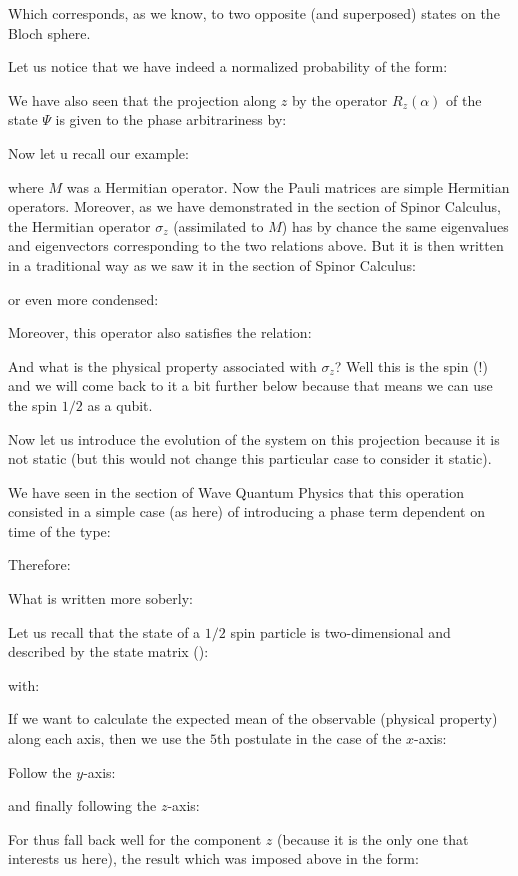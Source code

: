	Which corresponds, as we know, to two opposite (and superposed) states on the Bloch sphere.
	
	Let us notice that we have indeed a normalized probability of the form:
	
	We have also seen that the projection along $z$ by the operator $R_z(\alpha)$ of the state $\Psi$ is given to the phase arbitrariness by:
	
	Now let u recall our example:
	
	where $M$ was a Hermitian operator. Now the Pauli matrices are simple Hermitian operators. Moreover, as we have demonstrated in the section of Spinor Calculus, the Hermitian operator $\sigma_z$ (assimilated to $M$) has by chance the same eigenvalues and eigenvectors corresponding to the two relations above. But it is then written in a traditional way as we saw it in the section of Spinor Calculus:
	
	or even more condensed:
	
	Moreover, this operator also satisfies the relation:
	
	And what is the physical property associated with $\sigma_z$? Well this is the spin (!) and we will come back to it a bit further below because that means we can use the spin $1/2$ as a qubit.

	Now let us introduce the evolution of the system on this projection because it is not static (but this would not change this particular case to consider it static).

	We have seen in the section of Wave Quantum Physics that this operation consisted in a simple case (as here) of introducing a phase term dependent on time of the type:
	
	Therefore:
	
	What is written more soberly:
	
	Let us recall that the state of a $1/2$ spin particle is two-dimensional and described by the state matrix ():
	
	with:
	
	If we want to calculate the expected mean of the observable (physical property) along each axis, then we use the $5$th postulate in the case of the $x$-axis:
	
	Follow the $y$-axis:
	
	and finally following the $z$-axis:
	
	For thus fall back well for the component $z$ (because it is the only one that interests us here), the result which was imposed above in the form:
	
